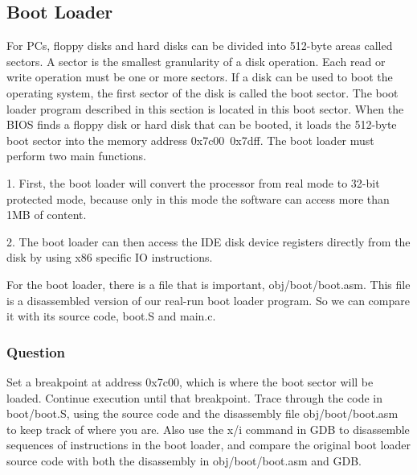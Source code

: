 \subsection{Boot Loader}
For PCs, floppy disks and hard disks can be divided into 512-byte areas called sectors. A sector is the smallest granularity of a disk operation. Each read or write operation must be one or more sectors. If a disk can be used to boot the operating system, the first sector of the disk is called the boot sector. The boot loader program described in this section is located in this boot sector. When the BIOS finds a floppy disk or hard disk that can be booted, it loads the 512-byte boot sector into the memory address 0x7c00~0x7dff.
The boot loader must perform two main functions.

 1. First, the boot loader will convert the processor from real mode to 32-bit protected mode, because only in this mode the software can access more than 1MB of content.

 2. The boot loader can then access the IDE disk device registers directly from the disk by using x86 specific IO instructions.

For the boot loader, there is a file that is important, obj/boot/boot.asm. This file is a disassembled version of our real-run boot loader program. So we can compare it with its source code, boot.S and main.c.

\subsubsection{Question }
Set a breakpoint at address 0x7c00, which is where the boot sector will be loaded. Continue execution until that breakpoint. Trace through the code in boot/boot.S, using the source code and the disassembly file obj/boot/boot.asm to keep track of where you are. Also use the x/i command in GDB to disassemble sequences of instructions in the boot loader, and compare the original boot loader source code with both the disassembly in obj/boot/boot.asm and GDB.

